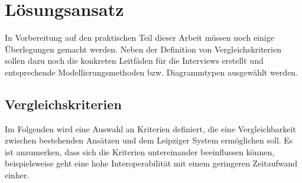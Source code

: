 \chapter{Lösungsansatz}\label{ch:approach}

In Vorbereitung auf den praktischen Teil dieser Arbeit müssen noch einige Überlegungen gemacht werden. Neben der Definition von Vergleichskriterien sollen dazu noch die konkreten Leitfäden für die Interviews erstellt und entsprechende Modellierungsmethoden bzw. Diagrammtypen ausgewählt werden.

\section{Vergleichskriterien}

Im Folgenden wird eine Auswahl an Kriterien definiert, die eine Vergleichbarkeit zwischen bestehenden Ansätzen und dem Leipziger System ermöglichen soll. Es ist anzumerken, dass sich die Kriterien untereinander beeinflussen können, beispielsweise geht eine hohe Interoperabilität mit einem geringeren Zeitaufwand einher.

